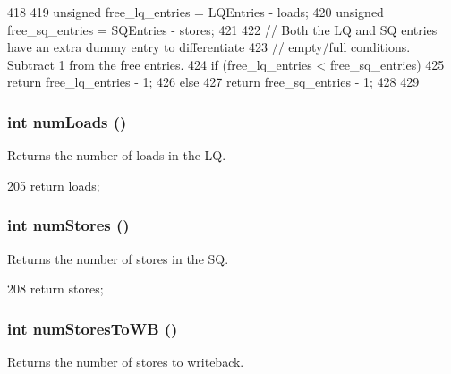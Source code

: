 \begin{DoxyCode}
418 {
419     unsigned free_lq_entries = LQEntries - loads;
420     unsigned free_sq_entries = SQEntries - stores;
421 
422     // Both the LQ and SQ entries have an extra dummy entry to differentiate
423     // empty/full conditions.  Subtract 1 from the free entries.
424     if (free_lq_entries < free_sq_entries) {
425         return free_lq_entries - 1;
426     } else {
427         return free_sq_entries - 1;
428     }
429 }
\end{DoxyCode}
\hypertarget{classLSQUnit_a54460b759fb06e2b18e26657279a6f49}{
\subsubsection[{numLoads}]{\setlength{\rightskip}{0pt plus 5cm}int numLoads ()}}
\label{classLSQUnit_a54460b759fb06e2b18e26657279a6f49}
Returns the number of loads in the LQ. 


\begin{DoxyCode}
205 { return loads; }
\end{DoxyCode}
\hypertarget{classLSQUnit_aa0fc32a4a9d77696f5907f4d25e7d07f}{
\subsubsection[{numStores}]{\setlength{\rightskip}{0pt plus 5cm}int numStores ()}}
\label{classLSQUnit_aa0fc32a4a9d77696f5907f4d25e7d07f}
Returns the number of stores in the SQ. 


\begin{DoxyCode}
208 { return stores; }
\end{DoxyCode}
\hypertarget{classLSQUnit_a276cdbdaf4551f1b846c4e2535c5f882}{
\subsubsection[{numStoresToWB}]{\setlength{\rightskip}{0pt plus 5cm}int numStoresToWB ()}}
\label{classLSQUnit_a276cdbdaf4551f1b846c4e2535c5f882}
Returns the number of stores to writeback. 


